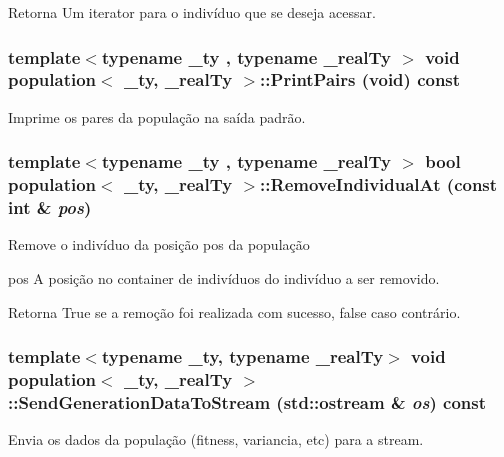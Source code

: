 \begin{DoxyReturn}{Retorna}
Um iterator para o indivíduo que se deseja acessar. 
\end{DoxyReturn}
\hypertarget{classpopulation_aba14d0fb6ceb7499c4fc4838889ba918}{
\subsubsection[{PrintPairs}]{\setlength{\rightskip}{0pt plus 5cm}template$<$typename \_\-ty , typename \_\-realTy $>$ void {\bf population}$<$ \_\-ty, \_\-realTy $>$::PrintPairs (void) const}}
\label{classpopulation_aba14d0fb6ceb7499c4fc4838889ba918}
Imprime os pares da população na saída padrão. \hypertarget{classpopulation_a1c227882a579ffe0b2fb049518e1eb85}{
\subsubsection[{RemoveIndividualAt}]{\setlength{\rightskip}{0pt plus 5cm}template$<$typename \_\-ty , typename \_\-realTy $>$ bool {\bf population}$<$ \_\-ty, \_\-realTy $>$::RemoveIndividualAt (const int \& {\em pos})}}
\label{classpopulation_a1c227882a579ffe0b2fb049518e1eb85}
Remove o indivíduo da posição pos da população

pos A posição no container de indivíduos do indivíduo a ser removido.

\begin{DoxyReturn}{Retorna}
True se a remoção foi realizada com sucesso, false caso contrário. 
\end{DoxyReturn}
\hypertarget{classpopulation_a2ddcfb41305717b30051f0aa0a8e240c}{
\subsubsection[{SendGenerationDataToStream}]{\setlength{\rightskip}{0pt plus 5cm}template$<$typename \_\-ty, typename \_\-realTy$>$ void {\bf population}$<$ \_\-ty, \_\-realTy $>$::SendGenerationDataToStream (std::ostream \& {\em os}) const}}
\label{classpopulation_a2ddcfb41305717b30051f0aa0a8e240c}
Envia os dados da população (fitness, variancia, etc) para a stream.

